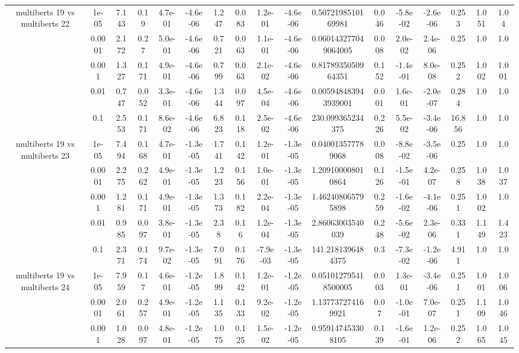 \begin{tabular}{|c|c|c|c|c|c|c|c|c|c|c|c|c|c|c|c|c|}
\hline
\multirow{5}{*}{multiberts 19 vs multiberts 22} & 1e-05 & 7.143 & 0.19 & 4.7e-01 & -4.6e-06 & 1.247 & 0.083 & 1.2e-01 & -4.6e-06 & 0.5072198510169981 & 0.046 & -5.8e-02 & -2.6e-06 & 0.253 & 1.051 & 1.04 \\
 & 0.0001 & 2.172 & 0.27 & 5.0e-01 & -4.6e-06 & 0.721 & 0.063 & 1.1e-01 & -4.6e-06 & 0.060143277049064005 & 0.008 & 2.0e-02 & 2.4e-06 & 0.25 & 1.0 & 1.0 \\
 & 0.001 & 1.327 & 0.171 & 4.9e-01 & -4.6e-06 & 0.799 & 0.063 & 2.1e-02 & -4.6e-06 & 0.8178935050964351 & 0.152 & -1.4e-01 & 8.0e-08 & 0.252 & 1.002 & 1.001 \\
 & 0.01 & 0.747 & 0.052 & 3.3e-01 & -4.6e-06 & 1.344 & 0.097 & 4.5e-04 & -4.6e-06 & 0.005948483943939001 & 0.001 & 1.6e-01 & -2.0e-07 & 0.284 & 1.0 & 1.0 \\
 & 0.1 & 2.553 & 0.171 & 8.6e-02 & -4.6e-06 & 6.823 & 0.118 & 2.5e-02 & -4.6e-06 & 230.099365234375 & 0.226 & 5.5e-02 & -3.4e-06 & 16.856 & 1.0 & 1.0 \\
\hline
\multirow{5}{*}{multiberts 19 vs multiberts 23} & 1e-05 & 7.494 & 0.168 & 4.7e-01 & -1.3e-05 & 1.741 & 0.142 & 1.2e-01 & -1.3e-05 & 0.040013577789068 & 0.008 & -8.8e-02 & -3.5e-06 & 0.25 & 1.0 & 1.0 \\
 & 0.0001 & 2.275 & 0.262 & 4.9e-01 & -1.3e-05 & 1.223 & 0.156 & 1.0e-01 & -1.3e-05 & 1.209100008010864 & 0.126 & -1.5e-01 & 4.2e-07 & 0.258 & 1.038 & 1.037 \\
 & 0.001 & 1.281 & 0.171 & 4.9e-01 & -1.3e-05 & 1.373 & 0.182 & 2.2e-04 & -1.3e-05 & 1.462408065795898 & 0.259 & -1.6e-02 & -4.1e-06 & 0.251 & 1.002 & 1.0 \\
 & 0.01 & 0.985 & 0.097 & 3.8e-01 & -1.3e-05 & 2.38 & 0.16 & 1.2e-04 & -1.3e-05 & 2.86063003540039 & 0.248 & -5.6e-02 & 2.3e-06 & 0.331 & 1.149 & 1.423 \\
 & 0.1 & 2.371 & 0.174 & 9.7e-02 & -1.3e-05 & 7.091 & 0.176 & -7.9e-03 & -1.3e-05 & 141.2181396484375 & 0.3 & -7.3e-02 & -1.2e-06 & 4.911 & 1.0 & 1.0 \\
\hline
\multirow{5}{*}{multiberts 19 vs multiberts 24} & 1e-05 & 7.959 & 0.17 & 4.6e-01 & -1.2e-05 & 1.899 & 0.142 & 1.2e-01 & -1.2e-05 & 0.051012795418500005 & 0.003 & 1.3e-01 & -3.4e-06 & 0.251 & 1.001 & 1.006 \\
 & 0.0001 & 2.061 & 0.257 & 4.9e-01 & -1.2e-05 & 1.135 & 0.133 & 9.2e-02 & -1.2e-05 & 1.137737274169921 & 0.07 & -1.0e-01 & 7.0e-07 & 0.251 & 1.109 & 1.046 \\
 & 0.001 & 1.028 & 0.097 & 4.8e-01 & -1.2e-05 & 1.075 & 0.125 & 1.5e-02 & -1.2e-05 & 0.959147453308105 & 0.139 & -1.6e-01 & 1.2e-06 & 0.252 & 1.065 & 1.045 \\

\end{tabular}
